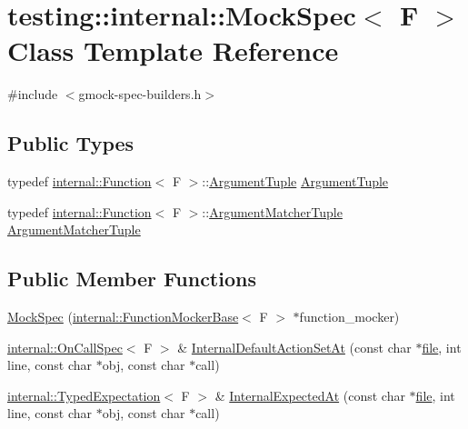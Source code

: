 \hypertarget{classtesting_1_1internal_1_1_mock_spec}{}\section{testing\+:\+:internal\+:\+:Mock\+Spec$<$ F $>$ Class Template Reference}
\label{classtesting_1_1internal_1_1_mock_spec}


{\ttfamily \#include $<$gmock-\/spec-\/builders.\+h$>$}

\subsection*{Public Types}
\begin{DoxyCompactItemize}
\item 
typedef \hyperlink{structtesting_1_1internal_1_1_function}{internal\+::\+Function}$<$ F $>$\+::\hyperlink{classtesting_1_1internal_1_1_mock_spec_a7d520daca5d4d937578b4c7e8f0cf43e}{Argument\+Tuple} \hyperlink{classtesting_1_1internal_1_1_mock_spec_a7d520daca5d4d937578b4c7e8f0cf43e}{Argument\+Tuple}
\item 
typedef \hyperlink{structtesting_1_1internal_1_1_function}{internal\+::\+Function}$<$ F $>$\+::\hyperlink{classtesting_1_1internal_1_1_mock_spec_a35dc5836483cb8c6882c365c447b26cd}{Argument\+Matcher\+Tuple} \hyperlink{classtesting_1_1internal_1_1_mock_spec_a35dc5836483cb8c6882c365c447b26cd}{Argument\+Matcher\+Tuple}
\end{DoxyCompactItemize}
\subsection*{Public Member Functions}
\begin{DoxyCompactItemize}
\item 
\hyperlink{classtesting_1_1internal_1_1_mock_spec_a067fe3d12433cec0aa63f396f4f55fa9}{Mock\+Spec} (\hyperlink{classtesting_1_1internal_1_1_function_mocker_base}{internal\+::\+Function\+Mocker\+Base}$<$ F $>$ $\ast$function\+\_\+mocker)
\item 
\hyperlink{classtesting_1_1internal_1_1_on_call_spec}{internal\+::\+On\+Call\+Spec}$<$ F $>$ \& \hyperlink{classtesting_1_1internal_1_1_mock_spec_a875c99443da1265604d87429693457f4}{Internal\+Default\+Action\+Set\+At} (const char $\ast$\hyperlink{_07copy_08_2_read_camera_model_8m_a151631b2fd2bb776ef06c9f440a7ed74}{file}, int line, const char $\ast$obj, const char $\ast$call)
\item 
\hyperlink{classtesting_1_1internal_1_1_typed_expectation}{internal\+::\+Typed\+Expectation}$<$ F $>$ \& \hyperlink{classtesting_1_1internal_1_1_mock_spec_a503a434637634014b9bb6c5d68fd336c}{Internal\+Expected\+At} (const char $\ast$\hyperlink{_07copy_08_2_read_camera_model_8m_a151631b2fd2bb776ef06c9f440a7ed74}{file}, int line, const char $\ast$obj, const char $\ast$call)
\end{DoxyCompactItemize}
